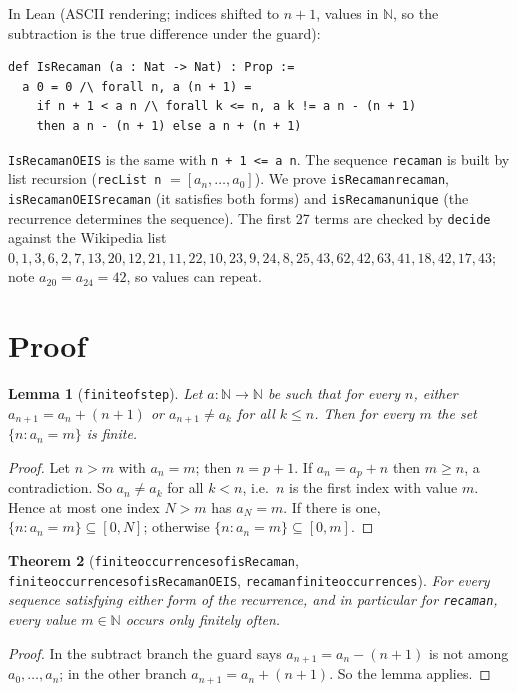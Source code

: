 \documentclass[11pt]{article}
\newtheorem{theorem}{Theorem}
\newtheorem{lemma}[theorem]{Lemma}
\theoremstyle{definition}
\theoremstyle{remark}
\renewcommand{\_}{\oldus\allowbreak}
\begin{document}
In Lean (ASCII rendering; indices shifted to $n+1$, values in $\mathbb{N}$, so the subtraction is the true difference
under the guard):
\begin{verbatim}
def IsRecaman (a : Nat -> Nat) : Prop :=
  a 0 = 0 /\ forall n, a (n + 1) =
    if n + 1 < a n /\ forall k <= n, a k != a n - (n + 1)
    then a n - (n + 1) else a n + (n + 1)
\end{verbatim}
\texttt{IsRecamanOEIS} is the same with \texttt{n + 1 <= a n}. The sequence \texttt{recaman} is built by
list recursion (\texttt{recList n} $= [a_n, \dots, a_0]$). We prove \texttt{isRecaman\_recaman},
\texttt{isRecamanOEIS\_recaman} (it satisfies both forms) and \texttt{isRecaman\_unique} (the recurrence
determines the sequence). The first 27 terms are checked by \texttt{decide} against the Wikipedia list
$0, 1, 3, 6, 2, 7, 13, 20, 12, 21, 11, 22, 10, 23, 9, 24, 8, 25, 43, 62, 42, 63, 41, 18, 42, 17, 43$;
note $a_{20} = a_{24} = 42$, so values can repeat.

\section{Proof}

\begin{lemma}[\texttt{finite\_of\_step}]
Let $a : \mathbb{N} \to \mathbb{N}$ be such that for every $n$, either $a_{n+1} = a_n + (n+1)$ or
$a_{n+1} \ne a_k$ for all $k \le n$. Then for every $m$ the set $\{n : a_n = m\}$ is finite.
\end{lemma}

\begin{proof}
Let $n > m$ with $a_n = m$; then $n = p + 1$. If $a_n = a_p + n$ then $m \ge n$, a contradiction. So
$a_n \ne a_k$ for all $k < n$, i.e.\ $n$ is the first index with value $m$. Hence at most one index
$N > m$ has $a_N = m$. If there is one, $\{n : a_n = m\} \subseteq [0, N]$; otherwise $\{n : a_n = m\}
\subseteq [0, m]$.
\end{proof}

\begin{theorem}[\texttt{finite\_occurrences\_of\_isRecaman}, \texttt{finite\_occurrences\_of\_isRecamanOEIS},
\texttt{recaman\_finite\_occurrences}]
For every sequence satisfying either form of the recurrence, and in particular for \texttt{recaman}, every
value $m \in \mathbb{N}$ occurs only finitely often.
\end{theorem}

\begin{proof}
In the subtract branch the guard says $a_{n+1} = a_n - (n+1)$ is not among $a_0, \dots, a_n$; in the
other branch $a_{n+1} = a_n + (n+1)$. So the lemma applies.
\end{proof}
\end{document}
